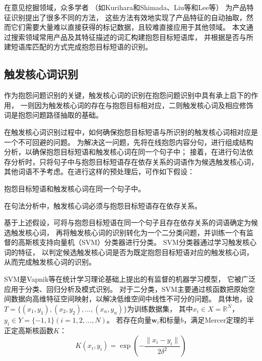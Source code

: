 在意见挖掘领域，众多学者
（如Kurihara和Shimada\cite{kurihara2015trouble}、Liu等\cite{liu2005opinion}和Lee等\cite{lee2016mining}）
为产品特征识别提出了很多不同的方法，
这些方法有效地实现了产品特征的自动抽取，然而它们需要大量难以直接获得的标记数据，且较难直接应用于其他领域。
本文通过搜索领域常用产品及其特征描述的词汇构建抱怨目标短语库，
并根据是否与所建短语库匹配的方式完成抱怨目标短语的识别。

\subsection{触发核心词识别}\label{subsection:1.3.3}
作为抱怨问题识别的关键，触发核心词的识别在抱怨问题识别中具有承上启下的作用，
一则因为触发核心词的存在与抱怨目标相对应，二则触发核心词及相应修饰词是抱怨问题路径抽取的基础。

在触发核心词识别过程中，如何确保抱怨目标短语与所识别的触发核心词相对应是一个不可回避的问题。
为解决这一问题，先将在线抱怨内容分句，进行组成结构分析，以确保抱怨目标短语和触发核心词在同一个句子中；
接着，在进行句法依存分析时，只将句子中与抱怨目标短语存在依存关系的词语作为候选触发核心词，
其他词语不予考虑。在进行这样的预处理后，可作如下假设：

\begin{assumption}\label{assumption:1.1}
    抱怨目标短语和触发核心词在同一个句子中。
\end{assumption}

\begin{assumption}\label{assumption:1.2}
    在句法分析中，触发核心词必须与抱怨目标短语存在依存关系。
\end{assumption}

基于上述假设，可将与抱怨目标短语在同一个句子且存在依存关系的词语确定为候选触发核心词，
再将触发核心词的识别转化为一个二分类问题，并训练一个有监督的高斯核支持向量机（SVM）分类器进行分类。
SVM分类器通过学习触发核心词的特征，
以判定候选触发核心词是否为既定抱怨目标短语对应的触发核心词，从而完成触发核心词的识别。

SVM是Vapnik等\cite{cortes1995support}在统计学习理论基础上提出的有监督的机器学习模型，
它被广泛应用于分类、回归分析及模式识别。
对于二分类，SVM主要通过核函数把原始空间数据向高维特征空间映射，以解决低维空间中线性不可分的问题。
具体地，设$T=\{(x_1,y_1 ),(x_2,y_2 ),\ldots,(x_n,y_n )\}$为训练数据集，
其中$x_i \in X=\mathbb R^N$，\/$y_i \in Y=\{-1,1\}(i=1,2,\ldots,N)$。
若存在向量$\bm w_i$和标量$b$，满足Mercer定理的半正定高斯核函数$K$：
\begin{equation}
    K(x_i,y_i )= \exp(- \frac{\| x_i - y_i \|}{2\delta ^2}) \label{eq:1.1}
\end{equation}

